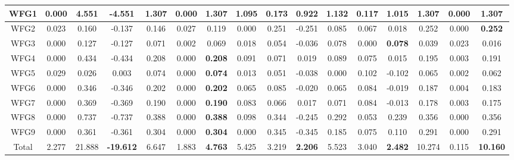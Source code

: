 \begin{table}[h]
{\begin{tabular}{|c|c|c|c|c|c|c|c|c|c|c|c|c|c|c|c|}
WFG1 & 0.000 & 4.551 & -4.551 & 1.307 & 0.000 & \textbf{1.307} & 1.095 & 0.173 & 0.922 & 1.132 & 0.117 & 1.015 & 1.307 & 0.000 & \textbf{1.307} \\ \hline
WFG2 & 0.023 & 0.160 & -0.137 & 0.146 & 0.027 & 0.119 & 0.000 & 0.251 & -0.251 & 0.085 & 0.067 & 0.018 & 0.252 & 0.000 & \textbf{0.252} \\ \hline
WFG3 & 0.000 & 0.127 & -0.127 & 0.071 & 0.002 & 0.069 & 0.018 & 0.054 & -0.036 & 0.078 & 0.000 & \textbf{0.078} & 0.039 & 0.023 & 0.016 \\ \hline
WFG4 & 0.000 & 0.434 & -0.434 & 0.208 & 0.000 & \textbf{0.208} & 0.091 & 0.071 & 0.019 & 0.089 & 0.075 & 0.015 & 0.195 & 0.003 & 0.191 \\ \hline
WFG5 & 0.029 & 0.026 & 0.003 & 0.074 & 0.000 & \textbf{0.074} & 0.013 & 0.051 & -0.038 & 0.000 & 0.102 & -0.102 & 0.065 & 0.002 & 0.062 \\ \hline
WFG6 & 0.000 & 0.346 & -0.346 & 0.202 & 0.000 & \textbf{0.202} & 0.065 & 0.085 & -0.020 & 0.065 & 0.084 & -0.019 & 0.187 & 0.004 & 0.183 \\ \hline
WFG7 & 0.000 & 0.369 & -0.369 & 0.190 & 0.000 & \textbf{0.190} & 0.083 & 0.066 & 0.017 & 0.071 & 0.084 & -0.013 & 0.178 & 0.003 & 0.175 \\ \hline
WFG8 & 0.000 & 0.737 & -0.737 & 0.388 & 0.000 & \textbf{0.388} & 0.098 & 0.344 & -0.245 & 0.292 & 0.053 & 0.239 & 0.356 & 0.000 & 0.356 \\ \hline
WFG9 & 0.000 & 0.361 & -0.361 & 0.304 & 0.000 & \textbf{0.304} & 0.000 & 0.345 & -0.345 & 0.185 & 0.075 & 0.110 & 0.291 & 0.000 & 0.291 \\ \hline
Total & 2.277 & 21.888 & \textbf{-19.612} & 6.647 & 1.883 & \textbf{4.763} & 5.425 & 3.219 & \textbf{2.206} & 5.523 & 3.040 & \textbf{2.482} & 10.274 & 0.115 & \textbf{10.160} \\ \hline
\end{tabular}%
}
\end{table}


